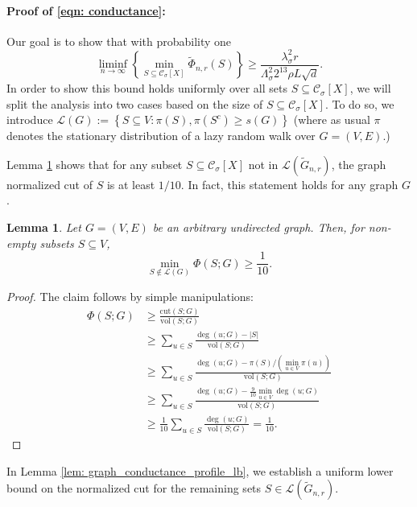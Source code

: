 \documentclass[11pt,twoside]{article}
\newtheorem{lemma}{Lemma}
\newcommand{\set}[1]{\left\{#1\right\}}
\newcommand{\vol}{\mathrm{vol}}
\newcommand{\cut}{\mathrm{cut}}
\newcommand{\abs}[1]{\left \lvert #1 \right \rvert}
\newcommand{\1}{\mathbf{1}}
\newcommand{\Xbf}{X}             %
\newcommand{\Cset}{\mathcal{C}}
\newcommand{\Csig}{\Cset_{\sigma}}
\begin{document}
\paragraph{Proof of \eqref{eqn: conductance}:}

Our goal is to show that with probability one
\begin{equation*}
\liminf_{n \to \infty} \set{\min_{S \subseteq \Csig[\Xbf]} \widetilde{\Phi}_{n,r}(S)} \geq \frac{\lambda_{\sigma}^2 r}{\Lambda_{\sigma}^2 2^{13} \rho L \sqrt{d}}.
\end{equation*}
In order to show this bound holds uniformly over all sets $S \subseteq \Csig[\Xbf]$, we will split the analysis into two cases based on the size of $S \subseteq \Csig[\Xbf]$. To do so, we introduce $\mathcal{L}(G) := \set{S \subseteq V: \pi(S), \pi(S^c) \geq s(G)}$ (where as usual $\pi$ denotes the stationary distribution of a lazy random walk over $G = (V,E)$.)

Lemma \ref{lem: graph_conductance_profile_lb_1} shows that for any subset $S \subseteq \Csig[\Xbf]$ not in $\mathcal{L}(\widetilde{G}_{n,r})$, the graph normalized cut of $S$ is at least $1/10$. In fact, this statement holds for any graph $G$.
\begin{lemma}
	\label{lem: graph_conductance_profile_lb_1}
	Let $G = (V,E)$ be an arbitrary undirected graph. Then, for non-empty subsets $S \subseteq V$, 
	\begin{equation*}
	\min_{S \not\in \mathcal{L}(G)}\Phi(S; G) \geq \frac{1}{10}.
	\end{equation*}
\end{lemma}
\begin{proof}
	The claim follows by simple manipulations:
	\begin{align*}
	\Phi(S;G) & \geq \frac{\cut(S;G)}{\vol(S;G)} \\
	& \geq \sum_{u \in S} \frac{\deg(u;G) - \abs{S}}{\vol(S;G)} \\
	& \geq \sum_{u \in S} \frac{\deg(u;G) - \pi(S)/(\min_{u \in V}\pi(u))}{\vol(S;G)} \\
	& \geq \sum_{u \in S} \frac{\deg(u;G) - \frac{9}{10} \min_{u \in V}\deg(u;G)}{\vol(S;G)} \\
	& \geq \frac{1}{10} \sum_{u \in S} \frac{\deg(u;G)}{\vol(S;G)} = \frac{1}{10}.
	\end{align*}
\end{proof}

In Lemma \ref{lem: graph_conductance_profile_lb}, we establish a uniform lower bound on the normalized cut for the remaining sets $S \in \mathcal{L}(\widetilde{G}_{n,r})$. 
\end{document}
